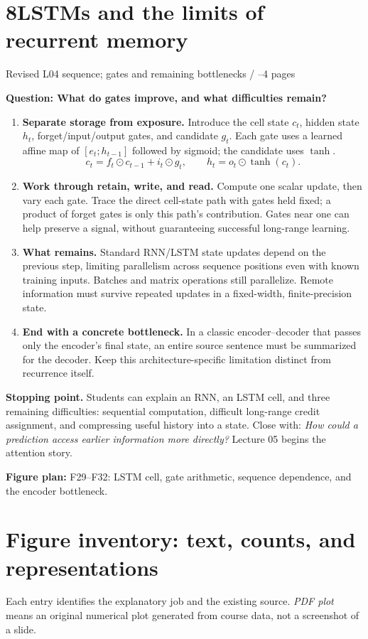 \documentclass[11pt,a4paper]{article}
\newcommand{\sectionplan}[3]{%
  \section{\texorpdfstring{#1\quad #2}{#1 #2}}
  {\small\color{muted}#3\par}}
\newcommand{\tagline}[1]{\textcolor{courseblue}{\textbf{#1}}}
\newcommand{\figids}[1]{\textcolor{courseteal}{\textbf{Figure plan:} #1}}
\begin{document}
\sectionplan{8}{LSTMs and the limits of recurrent memory}{Revised L04 sequence; gates and remaining bottlenecks \quad / \quad 3--4 pages}
\tagline{Question: What do gates improve, and what difficulties remain?}
\begin{enumerate}
  \item \textbf{Separate storage from exposure.} Introduce the cell state
  $c_t$, hidden state $h_t$, forget/input/output gates, and candidate $g_t$.
  Each gate uses a learned affine map of $[e_t;h_{t-1}]$ followed by sigmoid;
  the candidate uses $\tanh$.
  \[
  c_t=f_t\odot c_{t-1}+i_t\odot g_t,\qquad
  h_t=o_t\odot\tanh(c_t).
  \]
  \item \textbf{Work through retain, write, and read.} Compute one scalar
  update, then vary each gate. Trace the direct cell-state path with gates
  held fixed; a product of forget gates is only this path's contribution.
  Gates near one can help preserve a signal, without guaranteeing
  successful long-range learning.
  \item \textbf{What remains.} Standard RNN/LSTM state updates depend on
  the previous step, limiting parallelism across sequence positions even
  with known training inputs. Batches and matrix operations still
  parallelize. Remote information must survive repeated updates in a
  fixed-width, finite-precision state.
  \item \textbf{End with a concrete bottleneck.} In a classic
  encoder--decoder that passes only the encoder's final state, an entire
  source sentence must be summarized for the decoder. Keep this
  architecture-specific limitation distinct from recurrence itself.
\end{enumerate}
\textbf{Stopping point.} Students can explain an RNN, an LSTM cell, and
three remaining difficulties: sequential computation, difficult long-range
credit assignment, and compressing useful history into a state. Close with:
\emph{How could a prediction access earlier information more directly?}
Lecture 05 begins the attention story.

\figids{F29--F32: LSTM cell, gate arithmetic, sequence dependence,
and the encoder bottleneck.}

\clearpage
\section{Figure inventory: text, counts, and representations}
{\small Each entry identifies the explanatory job and the existing source.
\textit{PDF plot} means an original numerical plot generated from course data,
not a screenshot of a slide.}
\end{document}
